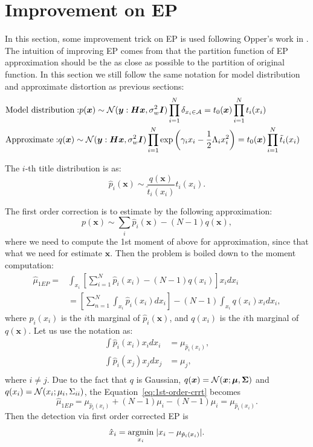 \documentclass{article}
\begin{document}
\section{Improvement on EP}\label{sec:imporveEP}
In this section, some improvement trick on EP is used following Opper's work in \cite{opper2008impovingEP}. The intuition of improving EP comes from that the partition function of EP approximation should be the as close as possible to the partition of original function. In this section we still follow the same notation for model distribution and approximate distortion as previous sections:
\begin{align}
  &\mathrm{Model~ distribution:} p(\bm{x}) \sim \mathcal{N}(\bm{y}: \bm{H}\bm{x}, \sigma_{w}^2\bm{I})\prod_{i=1}^{N}\delta_{{x_i}\in \mathcal{A}} = t_0(\bm{x})\prod_{i=1}^{N}t_i(x_i)\\
  &\mathrm{Approximate:} q(\bm{x}) \sim \mathcal{N}(\bm{y}: \bm{H}\bm{x}, \sigma_{w}^2\bm{I}) \prod_{i=1}^{N} \exp\left( \gamma_i x_i - \frac{1}{2}\Lambda_i x_i^2 \right)=t_0(\bm{x})\prod_{i=1}^{N}\tilde{t}_i(x_i)&
\end{align}

The $i$-th title distribution is as:
\begin{equation}
  \hat{p}_i(\bm{x}) \sim \frac{q(\bm{x})}{\tilde{t}_i(x_i)} t_i(x_i).
\end{equation}

The first order correction is to estimate by the following approximation:
\begin{equation}\label{eq:imp-ep-1order}
  p(\bm{x}) \sim \sum_{i} \hat{p}_i(\bm{x}) - (N-1) q(\bm{x}),
\end{equation}
where we need to compute the 1st moment of above for approximation, since that what we need for estimate $\bm{x}$. Then the problem is boiled down to the moment computation:
\begin{align}\label{eq:1st-order-crrt}
  \hat{\mu}_{1EP}=&\int_{x_i}\left[ \sum_{i=1}^{N} \hat{p}_i(x_i) - (N-1)q(x_i) \right]x_i d x_i \nonumber\\
                  &=\left[ \sum_{n=1}^{N} \int_{x_i}\hat{p}_i(x_i) d x_i \right] - (N-1)\int_{x_i}q(x_i) x_i d x_i,
\end{align}
where $\hat{p}_i(x_i)$ is the $i$th marginal of $\hat{p}_i(\bm{x})$, and $q(x_i)$ is the $i$th marginal of $q(\bm{x})$. Let us use the notation as:
\begin{align}
  \int \hat{p}_i(x_i) x_i d x_i &= \mu_{\hat{p}_i(x_i)}, \\
  \int \hat{p}_i(x_j) x_j d x_j &= \mu_{j}, \\
\end{align}
where $i \neq j$. Due to the fact that $q$ is Gaussian, $q(\bm{x}) = \mathcal{N}(\bm{x}; \bm{\mu}, \bm{\Sigma})$ and $q(x_i) = \mathcal{N}(x_i; \mu_i, \Sigma_{ii})$, the Equation~\eqref{eq:1st-order-crrt} becomes
\begin{equation}
  \hat{\mu}_{1EP} = \mu_{\hat{p}_i(x_i)} + (N-1) \mu_i - (N-1) \mu_i = \mu_{\hat{p}_i(x_i)}.
\end{equation}
Then the detection via first order corrected EP is
\begin{equation}
  \hat{x}_i = \underset{x_i}{\operatorname{argmin}}\; | x_i - \mu_{\hat{p}_i(x_i)} |.
\end{equation}
\end{document}
